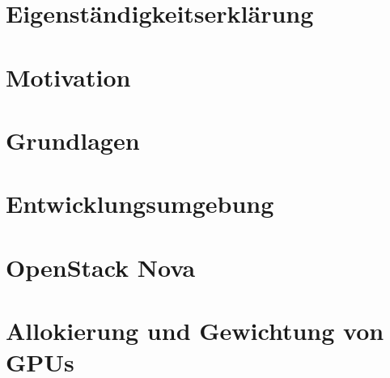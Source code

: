 \documentclass[ngerman, a4paper, 12pt, twoside]{article}
\numberwithin{equation}{section} %
\def\biblio{\clearpage} %
\begin{document}
\def\biblio{} %


\restoregeometry %

\thispagestyle{plain} %
\clearpage\mbox{}\clearpage %

\newpage
\section*{Eigenständigkeitserklärung}
    

\newpage
{} %
\section*{Motivation}
    
    
\newpage
{ %
\tableofcontents
}

\newpage
{} %
\setcounter{page}{1} %

\section{Grundlagen} %
\clearpage %

\section{Entwicklungsumgebung}
	
\clearpage

\section{OpenStack Nova}
	
\clearpage

\section{Allokierung und Gewichtung von GPUs}
	
\clearpage
\end{document}
